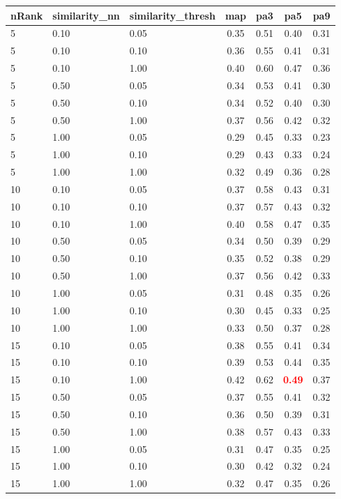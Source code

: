 \begin{tabular}{lllcccc} 
nRank & similarity\_nn & similarity\_thresh & map & pa3 & pa5 & pa9 \\ 
\hline 
 5 & 0.10 & 0.05 & 0.35 & 0.51 & 0.40 & 0.31 \\ 
 5 & 0.10 & 0.10 & 0.36 & 0.55 & 0.41 & 0.31 \\ 
 5 & 0.10 & 1.00 & 0.40 & 0.60 & 0.47 & 0.36 \\ 
 5 & 0.50 & 0.05 & 0.34 & 0.53 & 0.41 & 0.30 \\ 
 5 & 0.50 & 0.10 & 0.34 & 0.52 & 0.40 & 0.30 \\ 
 5 & 0.50 & 1.00 & 0.37 & 0.56 & 0.42 & 0.32 \\ 
 5 & 1.00 & 0.05 & 0.29 & 0.45 & 0.33 & 0.23 \\ 
 5 & 1.00 & 0.10 & 0.29 & 0.43 & 0.33 & 0.24 \\ 
 5 & 1.00 & 1.00 & 0.32 & 0.49 & 0.36 & 0.28 \\ 
10 & 0.10 & 0.05 & 0.37 & 0.58 & 0.43 & 0.31 \\ 
10 & 0.10 & 0.10 & 0.37 & 0.57 & 0.43 & 0.32 \\ 
10 & 0.10 & 1.00 & 0.40 & 0.58 & 0.47 & 0.35 \\ 
10 & 0.50 & 0.05 & 0.34 & 0.50 & 0.39 & 0.29 \\ 
10 & 0.50 & 0.10 & 0.35 & 0.52 & 0.38 & 0.29 \\ 
10 & 0.50 & 1.00 & 0.37 & 0.56 & 0.42 & 0.33 \\ 
10 & 1.00 & 0.05 & 0.31 & 0.48 & 0.35 & 0.26 \\ 
10 & 1.00 & 0.10 & 0.30 & 0.45 & 0.33 & 0.25 \\ 
10 & 1.00 & 1.00 & 0.33 & 0.50 & 0.37 & 0.28 \\ 
15 & 0.10 & 0.05 & 0.38 & 0.55 & 0.41 & 0.34 \\ 
15 & 0.10 & 0.10 & 0.39 & 0.53 & 0.44 & 0.35 \\ 
15 & 0.10 & 1.00 & 0.42 & 0.62 & \textbf{\textcolor{red}{0.49}} & 0.37 \\ 
15 & 0.50 & 0.05 & 0.37 & 0.55 & 0.41 & 0.32 \\ 
15 & 0.50 & 0.10 & 0.36 & 0.50 & 0.39 & 0.31 \\ 
15 & 0.50 & 1.00 & 0.38 & 0.57 & 0.43 & 0.33 \\ 
15 & 1.00 & 0.05 & 0.31 & 0.47 & 0.35 & 0.25 \\ 
15 & 1.00 & 0.10 & 0.30 & 0.42 & 0.32 & 0.24 \\ 
15 & 1.00 & 1.00 & 0.32 & 0.47 & 0.35 & 0.26 \\ 

\end{tabular}
